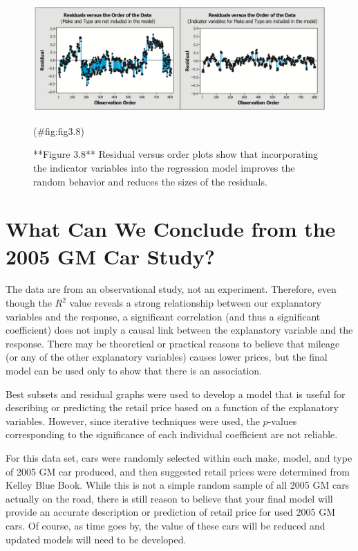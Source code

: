 \documentclass[
]{report}
\begin{document}
\begin{figure}

{\centering \includegraphics[width=1\linewidth]{docs/Fig3_8} 

}

\caption{**Figure 3.8** Residual versus order plots show that incorporating the indicator variables into the regression model improves the random behavior and reduces the sizes of the residuals.}(\#fig:fig3.8)
\end{figure}

\section{\texorpdfstring{\textbf{What Can We Conclude from the 2005 GM Car Study?}}{What Can We Conclude from the 2005 GM Car Study?}}\label{what-can-we-conclude-from-the-2005-gm-car-study}

The data are from an observational study, not an experiment. Therefore, even though the \(R^2\) value reveals a strong relationship between our explanatory variables and the response, a significant correlation (and thus a significant coefficient) does not imply a causal link between the explanatory variable and the response. There may be theoretical or practical reasons to believe that mileage (or any of the other
explanatory variables) causes lower prices, but the final model can be used only to show that there is an association.

Best subsets and residual graphs were used to develop a model that is useful for describing or predicting the retail price based on a function of the explanatory variables. However, since iterative techniques were used, the \(p\)-values corresponding to the significance of each individual coefficient are not reliable.

For this data set, cars were randomly selected within each make, model, and type of 2005 GM car produced, and then suggested retail prices were determined from Kelley Blue Book. While this is not a simple random sample of all 2005 GM cars actually on the road, there is still reason to believe that your final model will provide an accurate description or prediction of retail price for used 2005 GM cars. Of course, as time goes by, the value of these cars will be reduced and updated models will need to be developed.
\end{document}
